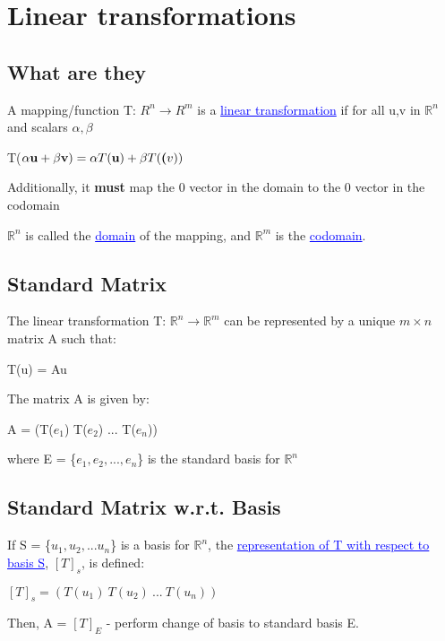 \documentclass{article}
\newcommand{\bul}[1]{\textcolor{blue}{\underline{#1}}}
\newcommand{\sbreak}{\vspace{10pt}}
\begin{document}
\section{Linear transformations}
\subsection{What are they}
A mapping/function T: $R^n \rightarrow R^m$ is a \bul{linear transformation} if for all u,v in $\mathbb{R}^n$ and scalars $\alpha, \beta$
\begin{center}
    T($\alpha\textbf{u} + \beta\textbf{v})=\alpha T(\textbf{u}) + \beta T(\textbf(v))$
\end{center}

Additionally, it \textbf{must} map the 0 vector in the domain to the 0 vector in the codomain

$\mathbb{R}^n$ is called the \bul{domain} of the mapping, and $\mathbb{R}^m$ is the \bul{codomain}.

\subsection{Standard Matrix}
The linear transformation T: $\mathbb{R}^n \rightarrow \mathbb{R}^m$ can be represented by a unique $m\times n$ matrix A such that:
\begin{center}
    T(u) = Au
\end{center}

\sbreak

The matrix A is given by:
\begin{center}
    A = (T($e_1$) T($e_2$) ... T($e_n$))
\end{center}
where E = \{$e_1, e_2, ..., e_n$\} is the standard basis for $\mathbb{R}^n$

\subsection{Standard Matrix w.r.t. Basis}
If S = \{$u_1,u_2,...u_n$\} is a basis for $\mathbb{R}^n$, the \bul{representation of T with respect to basis S}, $[T]_s$, is defined:
\begin{center}
    $[T]_s = (T(u_1)\ T(u_2)\ ...\ T(u_n))$
\end{center}
Then, A = $[T]_E$ - perform change of basis to standard basis E.
\end{document}
